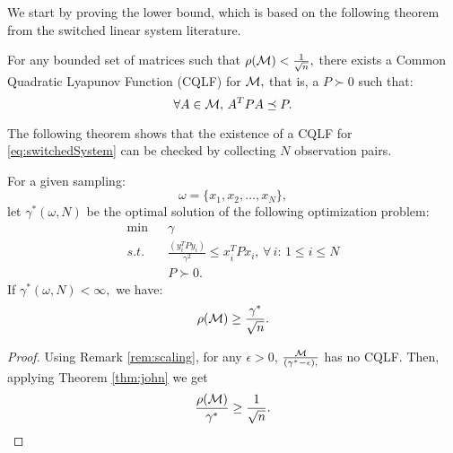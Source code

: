We start by proving the lower bound, which is based on the following theorem from the switched linear system literature.

\begin{theorem}\cite[Theorem 2.11]{jungers_lncis}\label{thm:john}
For any bounded set of matrices such that $\rho(\mathcal{M})<\frac{1}{\sqrt{n}},$ there exists a Common Quadratic Lyapunov Function (CQLF) for $\mathcal{M},$ that is, a $P\succ 0$ such that: $$\forall A\in \mathcal{M},\, A^TPA\preceq P. $$
\end{theorem}

The following theorem shows that the existence of a CQLF for \eqref{eq:switchedSystem} can be checked by collecting $N$ observation pairs.
%
%


\begin{theorem}
For a given sampling: $$\omega = \{x_1, x_2, \ldots, x_N\},$$ let $\gamma^*(\omega, N)$ be the optimal solution of the following optimization problem:
\begin{eqnarray}
\nonumber \mbox{min}&&\gamma\\
 s.t.& & \label{eq:lowerbound}\frac{(y_i^T P y_i)}{\gamma^2} \leq x_i^TPx_i,\,  \forall \,i : \,1\leq i \leq N\\
\nonumber && P \succ 0.
\end{eqnarray}
If $\gamma^*(\omega, N)<\infty,$ we have:
$$\rho(\mathcal{M}) \geq \frac{\gamma^*}{\sqrt{n}}.$$

\end{theorem}
\begin{proof}
Using Remark \ref{rem:scaling}, for any $\epsilon > 0$, $\frac{\mathcal{M}}{(\gamma^*-\epsilon),}$ has no CQLF. Then, applying Theorem \ref{thm:john} we get
\begin{equation*}\frac{\rho(\mathcal{M})}{\gamma^*} \geq \frac{1}{\sqrt{n}}.\end{equation*}
\end{proof}